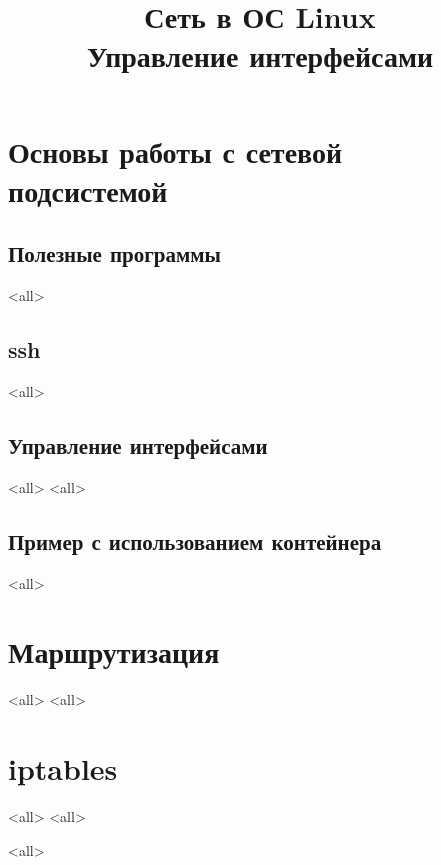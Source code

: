

\title{Сеть в ОС Linux\\Управление интерфейсами}








\begin{frame}
	\frametitle{}
	\titlepage
	\vspace{-0.5cm}
	\begin{center}
	\end{center}
\end{frame}




\section{Основы работы с сетевой подсистемой}


\subsection{Полезные программы}
\mode<all>{}

\subsection{ssh}
\mode<all>{}

\subsection{Управление интерфейсами}
\mode<all>{}
\mode<all>{}
\subsection{Пример с использованием контейнера}
\mode<all>{}

\section{Маршрутизация}
\mode<all>{}
\mode<all>{}

\section{iptables}
\mode<all>{}
\mode<all>{}

\mode<all>

